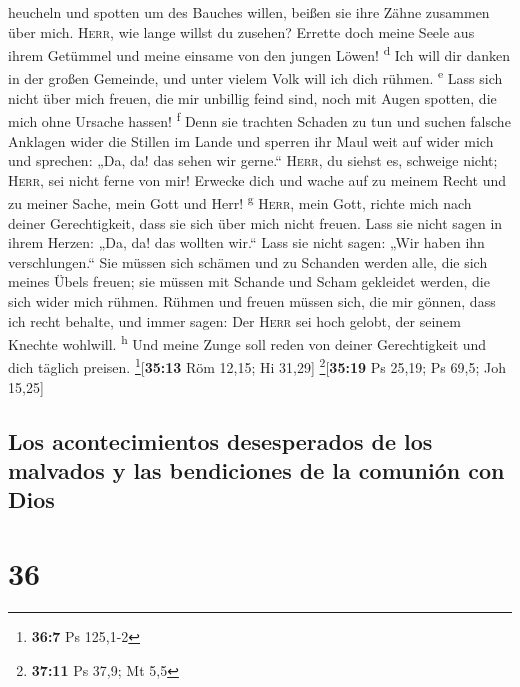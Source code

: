 heucheln und spotten um des Bauches willen, beißen sie ihre Zähne
zusammen über mich.  \textsc{Herr}, wie lange willst du
zusehen? Errette doch meine Seele aus ihrem Getümmel und meine einsame
von den jungen Löwen! \textsuperscript{d}  Ich will dir
danken in der großen Gemeinde, und unter vielem Volk will ich dich
rühmen. \textsuperscript{e}  Lass sich nicht über mich
freuen, die mir unbillig feind sind, noch mit Augen spotten, die mich
ohne Ursache hassen! \textsuperscript{f}  Denn sie
trachten Schaden zu tun und suchen falsche Anklagen wider die Stillen im
Lande  und sperren ihr Maul weit auf wider mich und
sprechen: „Da, da! das sehen wir gerne.``  \textsc{Herr},
du siehst es, schweige nicht; \textsc{Herr}, sei nicht ferne von mir!
 Erwecke dich und wache auf zu meinem Recht und zu meiner
Sache, mein Gott und Herr! \textsuperscript{g} 
\textsc{Herr}, mein Gott, richte mich nach deiner Gerechtigkeit, dass
sie sich über mich nicht freuen.  Lass sie nicht sagen in
ihrem Herzen: „Da, da! das wollten wir.`` Lass sie nicht sagen: „Wir
haben ihn verschlungen.``  Sie müssen sich schämen und zu
Schanden werden alle, die sich meines Übels freuen; sie müssen mit
Schande und Scham gekleidet werden, die sich wider mich rühmen.
 Rühmen und freuen müssen sich, die mir gönnen, dass ich
recht behalte, und immer sagen: Der \textsc{Herr} sei hoch gelobt, der
seinem Knechte wohlwill. \textsuperscript{h}  Und meine
Zunge soll reden von deiner Gerechtigkeit und dich täglich preisen.
\footnote{\textbf{36:7} Ps 125,1-2}{[}\textbf{35:13} Röm 12,15; Hi
31,29{]} \footnote{\textbf{37:11} Ps 37,9; Mt 5,5}{[}\textbf{35:19} Ps
25,19; Ps 69,5; Joh 15,25{]}

\hypertarget{los-acontecimientos-desesperados-de-los-malvados-y-las-bendiciones-de-la-comuniuxf3n-con-dios}{%
\subsection{Los acontecimientos desesperados de los malvados y las
bendiciones de la comunión con
Dios}\label{los-acontecimientos-desesperados-de-los-malvados-y-las-bendiciones-de-la-comuniuxf3n-con-dios}}

\hypertarget{section-35}{%
\section{36}\label{section-35}}


